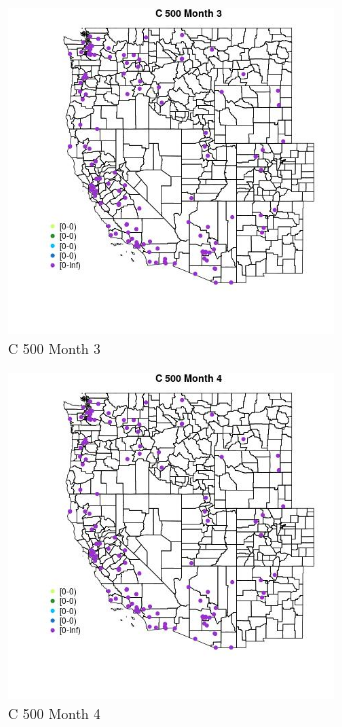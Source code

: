 \begin{figure} 
\centering  
\includegraphics[width=0.77\textwidth]{Code_Outputs/Report_ML_input_PM25_Step4_part_e_de_duplicated_aves_MapObsMo3C_500.jpg} 
\caption{\label{fig:Report_ML_input_PM25_Step4_part_e_de_duplicated_avesMapObsMo3C_500}C 500 Month 3} 
\end{figure} 
 

\clearpage 

\begin{figure} 
\centering  
\includegraphics[width=0.77\textwidth]{Code_Outputs/Report_ML_input_PM25_Step4_part_e_de_duplicated_aves_MapObsMo4C_500.jpg} 
\caption{\label{fig:Report_ML_input_PM25_Step4_part_e_de_duplicated_avesMapObsMo4C_500}C 500 Month 4} 
\end{figure} 
 

